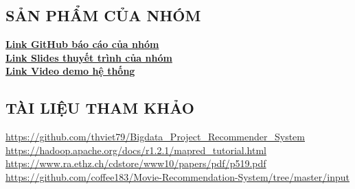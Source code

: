 \begin{center}
    \section*{SẢN PHẨM CỦA NHÓM}
\end{center}
\begin{flushleft}
    \vspace{0.5cm}
    \href{https://github.com/manhbd-22022602/Bigdata-Movie-Recommendation}{\textbf{Link GitHub báo cáo của nhóm}}\\
    \vspace{0.5cm}
    \href{https://www.canva.com/design/DAGGDTSDSVg/zqqq_q9GcmJw8djuh1G9Kg/edit}{\textbf{Link Slides thuyết trình của nhóm}}\\
    \vspace{0.5cm}
    \href{https://www.youtube.com/watch?v=rOyGpW_HzME}{\textbf{Link Video demo hệ thống}}
\end{flushleft}

\begin{center}
    \section*{TÀI LIỆU THAM KHẢO}
\end{center}
\begin{flushleft}
    \vspace{0.5cm}
    \url{https://github.com/thviet79/Bigdata_Project_Recommender_System}\\
    \vspace{0.5cm}
    \url{https://hadoop.apache.org/docs/r1.2.1/mapred_tutorial.html}\\
    \vspace{0.5cm}
    \url{https://www.ra.ethz.ch/cdstore/www10/papers/pdf/p519.pdf}\\
    \vspace{0.5cm}
    \url{https://github.com/coffee183/Movie-Recommendation-System/tree/master/input}\\
\end{flushleft}

